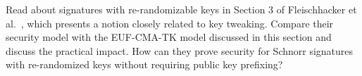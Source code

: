 \begin{exercise}[Optional]
  Read about signatures with re-randomizable keys in Section 3 of Fleischhacker et al.~\cite{PKC:FKMSSS16}, which presents a notion closely related to key tweaking.
  Compare their security model with the EUF-CMA-TK model discussed in this section and discuss the practical impact.
  How can they prove security for Schnorr signatures with re-randomized keys without requiring public key prefixing?
\end{exercise}
